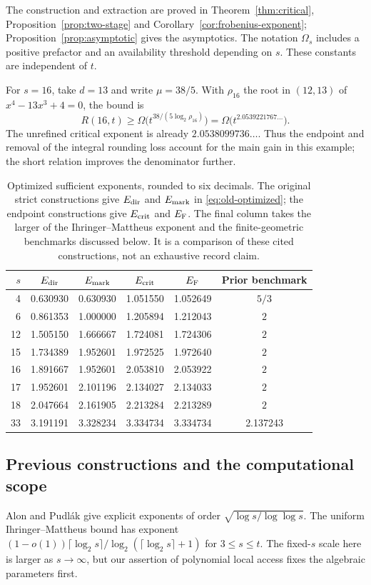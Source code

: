 \documentclass[11pt,a4paper]{article}
\theoremstyle{definition}
\theoremstyle{remark}
\numberwithin{equation}{section}
\begin{document}
The construction and extraction are proved in Theorem~\ref{thm:critical}, Proposition~\ref{prop:two-stage} and Corollary~\ref{cor:frobenius-exponent}; Proposition~\ref{prop:asymptotic} gives the asymptotics. The notation $\Omega_s$ includes a positive prefactor and an availability threshold depending on $s$. These constants are independent of $t$.

For $s=16$, take $d=13$ and write $\mu=38/5$. With $\rho_{16}$ the root in $(12,13)$ of $x^4-13x^3+4=0$, the bound is
\[
R(16,t)\ge\Omega\bigl(t^{38/(5\log_2\rho_{16})}\bigr)
=\Omega\bigl(t^{2.0539221767\ldots}\bigr).
\]
The unrefined critical exponent is already $2.0538099736\ldots$. Thus the endpoint and removal of the integral rounding loss account for the main gain in this example; the short relation improves the denominator further.

\begin{table}[t]
\centering\small
\setlength{\tabcolsep}{5pt}
\begin{tabular}{rccccc}
\toprule
$s$ & $E_{\rm dir}$ & $E_{\rm mark}$ & $E_{\rm crit}$ & $E_{\rm F}$ & Prior benchmark\\
\midrule
4  & 0.630930 & 0.630930 & 1.051550 & 1.052649 & $5/3$\\
6  & 0.861353 & 1.000000 & 1.205894 & 1.212043 & $2$\\
12 & 1.505150 & 1.666667 & 1.724081 & 1.724306 & $2$\\
15 & 1.734389 & 1.952601 & 1.972525 & 1.972640 & $2$\\
16 & 1.891667 & 1.952601 & 2.053810 & 2.053922 & $2$\\
17 & 1.952601 & 2.101196 & 2.134027 & 2.134033 & $2$\\
18 & 2.047664 & 2.161905 & 2.213284 & 2.213289 & $2$\\
33 & 3.191191 & 3.328234 & 3.334734 & 3.334734 & 2.137243\\
\bottomrule
\end{tabular}
\caption{Optimized sufficient exponents, rounded to six decimals. The original strict constructions give $E_{\rm dir}$ and $E_{\rm mark}$ in \eqref{eq:old-optimized}; the endpoint constructions give $E_{\rm crit}$ and $E_{\rm F}$. The final column takes the larger of the Ihringer--Mattheus exponent and the finite-geometric benchmarks discussed below. It is a comparison of these cited constructions, not an exhaustive record claim.}\label{tab:comparison}
\end{table}

\subsection{Previous constructions and the computational scope}
Alon and Pudl\'ak \cite{AP} give explicit exponents of order $\sqrt{\log s/\log\log s}$. The uniform Ihringer--Mattheus bound \cite[Theorem 1.3]{IM} has exponent $(1-o(1))\lceil\log_2s\rceil/\log_2(\lceil\log_2s\rceil+1)$ for $3\le s\le t$. The fixed-$s$ scale here is larger as $s\to\infty$, but our assertion of polynomial local access fixes the algebraic parameters first.
\end{document}
